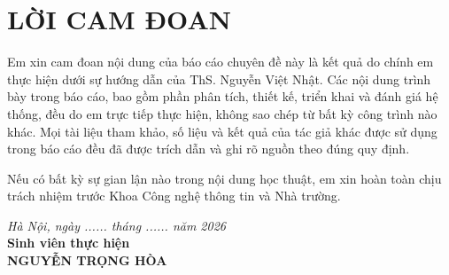 \chapter*{LỜI CAM ĐOAN}

Em xin cam đoan nội dung của báo cáo chuyên đề này là kết quả do chính em thực
hiện dưới sự hướng dẫn của ThS. Nguyễn Việt Nhật. Các nội dung trình bày
trong báo cáo, bao gồm phần phân tích, thiết kế, triển khai và đánh giá hệ
thống, đều do em trực tiếp thực hiện, không sao chép từ bất kỳ công trình nào
khác. Mọi tài liệu tham khảo, số liệu và kết quả của tác giả khác được sử dụng
trong báo cáo đều đã được trích dẫn và ghi rõ nguồn theo đúng quy định.

Nếu có bất kỳ sự gian lận nào trong nội dung học thuật, em xin hoàn toàn chịu
trách nhiệm trước Khoa Công nghệ thông tin và Nhà trường.

\vspace{1.5cm}
\begin{flushright}
\textit{Hà Nội, ngày ...... tháng ...... năm 2026}\\[0.3cm]
\textbf{Sinh viên thực hiện}\\[1.8cm]
\textbf{NGUYỄN TRỌNG HÒA}
\end{flushright}
